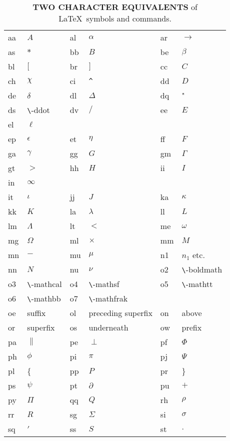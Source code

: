 \begin{table}[tbph]
\begin{center}
\caption{\textbf{\textsf{TWO CHARACTER EQUIVALENTS}} of \LaTeX \ symbols and commands.  \label{tab:twoclatex} }
\begin{tabular}{||p{1.5cm}|p{4cm}||p{1.5cm}|p{4cm}||p{1.5cm}|p{4cm}||}
\hline
aa & $A$ & al & $\alpha$ & ar & $\rightarrow$ \\
as & $*$ & bb & $B$ & be & $\beta$ \\
bl & $[$ & br & $]$ & cc & $C$ \\
ch & $\chi$ & ci & \verb-^- & dd & $D$ \\
de & $\delta$ & dl & $\Delta$ & dq & " \\
ds & \verb-\-ddot & dv & $/$ & ee & $E$ \\
el & $\ell$ &  &  & &  \\
ep & $\epsilon$ & et & $\eta$ & ff & $F$ \\
ga & $\gamma$ & gg & $G$ & gm & $\Gamma$ \\
gt & $>$ & hh & $H$ & ii & $I$ \\
in & $\infty$ & & & & \\
it & $\iota$ & jj & $J$ & ka & $\kappa$ \\
kk & $K$ & la & $\lambda$ & ll & $L$ \\
lm & $\Lambda$ & lt & $<$ & me & $\omega$ \\
mg & $\Omega$ & ml & $\times$ & mm & $M$ \\
mn & $-$ & mu & $\mu$ & n1 & $n_1$ etc. \\
nn & $N$ & nu & $\nu$ & o2 & \verb-\-boldmath \\
o3 & \verb-\-mathcal & o4 & \verb-\-mathsf & o5 & \verb-\-mathtt \\
o6 & \verb-\-mathbb & o7 & \verb-\-mathfrak & \\
oe &  suffix  & ol &  preceding superfix  & on &  above  \\
or &  superfix  & os &  underneath  & ow &  prefix  \\
pa & $\|$ & pe & $\perp$ & pf & $\Phi$ \\
ph & $\phi$ & pi & $\pi$ & pj & $\Psi$ \\
pl & \{ & pp & $P$ & pr & \} \\
ps & $\psi$ & pt & $\partial$ & pu & $+$ \\
py & $\Pi$ & qq & $Q$ & rh & $\rho$ \\
rr & $R$ & sg & $\Sigma$ & si & $\sigma$ \\
sq & $'$ & ss & $S$ & st & $.$ \\

\end{tabular}
\end{center}
\end{table}
